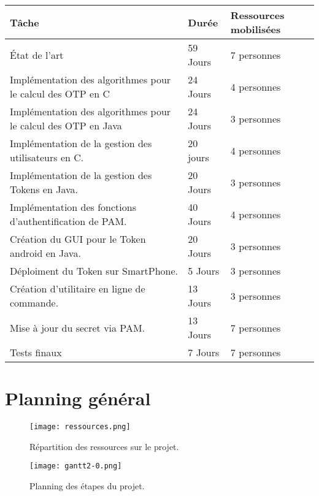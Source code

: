 \documentclass{../../res/univ-projet}
\begin{document}
	\begin{tabular}{|l|l|l|}
	 	\hline
		Tâche & Durée & Ressources mobilisées \\ 
		\hline
		État de l'art & 59 Jours & 7 personnes \\
		Implémentation des algorithmes pour le calcul des OTP en C & 24 Jours & 4 personnes \\
		Implémentation des algorithmes pour le calcul des OTP en Java & 24 Jours & 3 personnes \\
		Implémentation de la gestion des utilisateurs en C. & 20 jours & 4 personnes \\
		Implémentation de la gestion des Tokens en Java. & 20 Jours & 3 personnes \\
		Implémentation des fonctions d'authentification de PAM. & 40 Jours & 4 personnes \\
	  	Création du GUI pour le Token android en Java. & 20 Jours & 3 personnes \\
		Déploiment du Token sur SmartPhone. & 5 Jours & 3 personnes \\
	  	Création d'utilitaire en ligne de commande. & 13 Jours & 3 personnes \\
	  	Mise à jour du secret via PAM. & 13 Jours & 7 personnes \\
		Tests finaux & 7 Jours & 7 personnes \\ 
		\hline
	\end{tabular}

\newpage
\section{Planning général}
	
	\begin{figure}[h!]
		\centering
		\texttt{[image: ressources.png]}
		\caption{Répartition des ressources sur le projet.}
	\end{figure}
	
	
	\newpage
	
	\begin{figure}[h!]
		\centering
		\texttt{[image: gantt2-0.png]}
		\caption{Planning des étapes du projet.}
	\end{figure}
	
	\newpage

\end{document}
